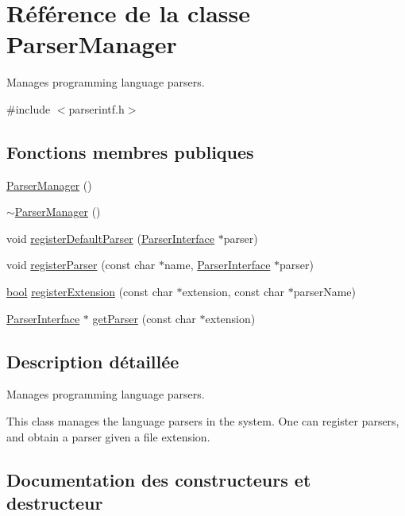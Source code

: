 \hypertarget{class_parser_manager}{}\section{Référence de la classe Parser\+Manager}
\label{class_parser_manager}


Manages programming language parsers.  




{\ttfamily \#include $<$parserintf.\+h$>$}

\subsection*{Fonctions membres publiques}
\begin{DoxyCompactItemize}
\item 
\hyperlink{class_parser_manager_a6d40c2ea132a10d04515db91b170023c}{Parser\+Manager} ()
\item 
\hyperlink{class_parser_manager_aacefe905bd0f76c05d346537c1e31ad8}{$\sim$\+Parser\+Manager} ()
\item 
void \hyperlink{class_parser_manager_a14594ae0488507a53c9700d7b2722719}{register\+Default\+Parser} (\hyperlink{class_parser_interface}{Parser\+Interface} $\ast$parser)
\item 
void \hyperlink{class_parser_manager_a04ff0e1b281d0b10b42688f6bce1d296}{register\+Parser} (const char $\ast$name, \hyperlink{class_parser_interface}{Parser\+Interface} $\ast$parser)
\item 
\hyperlink{qglobal_8h_a1062901a7428fdd9c7f180f5e01ea056}{bool} \hyperlink{class_parser_manager_a2184813c0cd50eda1cf6ce74bf50d8b5}{register\+Extension} (const char $\ast$extension, const char $\ast$parser\+Name)
\item 
\hyperlink{class_parser_interface}{Parser\+Interface} $\ast$ \hyperlink{class_parser_manager_a69f9874c260df7559242ec5833051ac5}{get\+Parser} (const char $\ast$extension)
\end{DoxyCompactItemize}


\subsection{Description détaillée}
Manages programming language parsers. 

This class manages the language parsers in the system. One can register parsers, and obtain a parser given a file extension. 

\subsection{Documentation des constructeurs et destructeur}
\hypertarget{class_parser_manager_a6d40c2ea132a10d04515db91b170023c}{}
